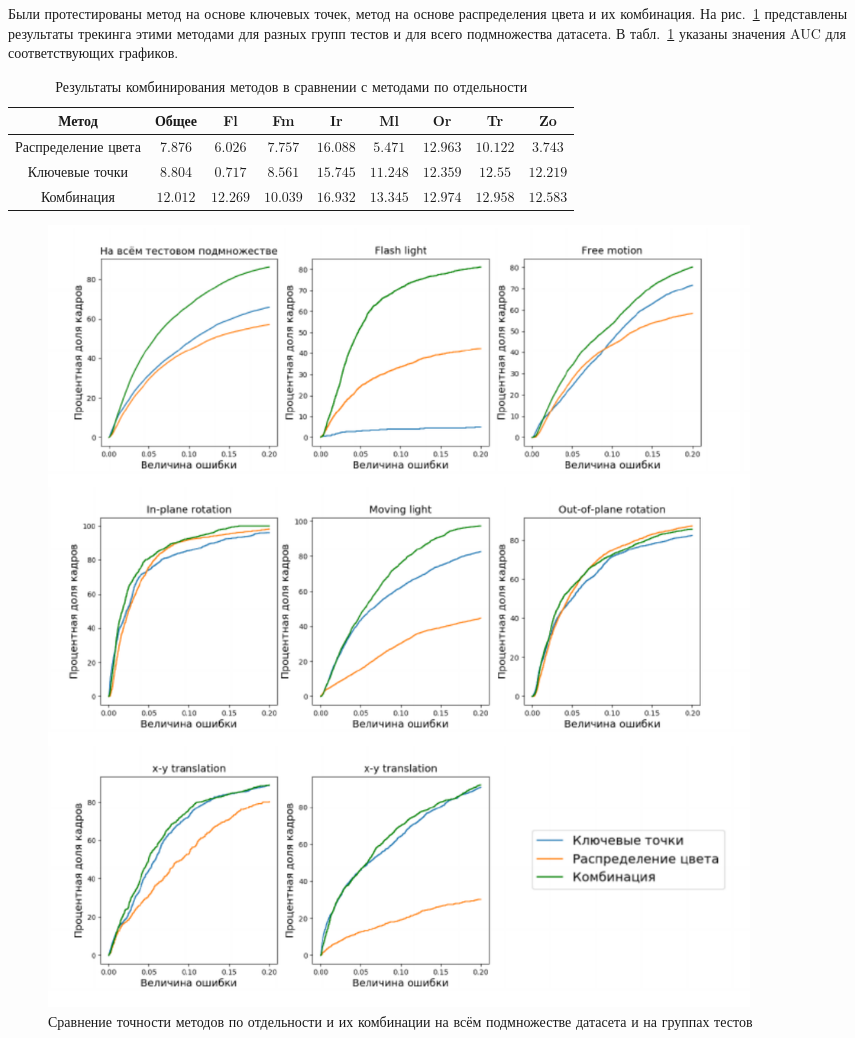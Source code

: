 Были протестированы метод на основе ключевых точек, метод на основе
распределения цвета и их комбинация.
На рис.~\ref{fig:combining-plots} представлены результаты трекинга этими
методами для разных групп тестов и для всего подмножества датасета.
В табл.~\ref{tab:combine} указаны значения AUC для соответствующих графиков.

\begin{table}[h]
\caption{\label{tab:combine}Результаты комбинирования методов в сравнении с
методами по отдельности}
\begin{center}
\begin{tabular}{|c|c|c|c|c|c|c|c|c|}
\hline
Метод & Общее & Fl & Fm & Ir & Ml & Or & Tr & Zo \\
\hline
Распределение цвета & 7.876 & $6.026$ & $7.757$ & $16.088$ & $5.471$ & $12.963$
&
$10.122$ & $3.743$ \\
\hline
Ключевые точки & 8.804 & $0.717$ & $8.561$ & $15.745$ & $11.248$ & $12.359$ &
$12.55$
&$12.219$ \\
\hline
Комбинация & $\mathbf{12.012}$ & $\mathbf{12.269}$ & $\mathbf{10.039}$ &
$\mathbf{16.932}$ &
$\mathbf{13.345}$ & $\mathbf{12.974}$ & $\mathbf{12.958}$ &
$\mathbf{12.583}$ \\
\hline
\end{tabular}
\end{center}
\end{table}

\begin{figure}
\centering
\includegraphics[width=0.9\textwidth]{fig/combining.pdf}
\caption{
Сравнение точности методов по отдельности и их комбинации на всём подмножестве
датасета и на группах тестов
}
\label{fig:combining-plots}
\end{figure}


